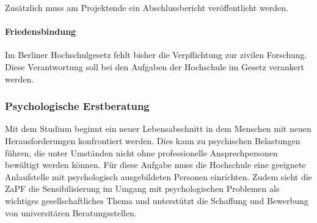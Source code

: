 Zusätzlich muss am Projektende ein Abschlussbericht veröffentlicht
werden.

\hypertarget{friedensbindung}{%
\paragraph{Friedensbindung}\label{friedensbindung}}

Im Berliner Hochschulgesetz fehlt bisher die Verpflichtung zur zivilen
Forschung. Diese Verantwortung soll bei den Aufgaben der Hochschule im
Gesetz verankert werden.

\hypertarget{psychologische-erstberatung}{%
\subsubsection{Psychologische
Erstberatung}\label{psychologische-erstberatung}}

Mit dem Studium beginnt ein neuer Lebensabschnitt in dem Menschen mit
neuen Herausforderungen konfrontiert werden. Dies kann zu psychischen
Belastungen führen, die unter Umständen nicht ohne professionelle
Ansprechpersonen bewältigt werden können. Für diese Aufgabe muss die
Hochschule eine geeignete Anlaufstelle mit psychologisch ausgebildeten
Personen einrichten. Zudem sieht die ZaPF die Sensibilisierung im Umgang
mit psychologischen Problemen als wichtiges gesellschaftliches Thema und
unterstützt die Schaffung und Bewerbung von universitären
Beratungsstellen.
